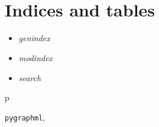 \documentclass[letterpaper,10pt,english]{sphinxmanual}
\begin{document}

\begin{fulllineitems}
\label{reference:Point.Point}~

\begin{fulllineitems}
\label{reference:Point.Point.vectorize}
\end{fulllineitems}


\end{fulllineitems}


\begin{fulllineitems}
\label{reference:GraphMLParser.GraphMLParser}~

\begin{fulllineitems}
\label{reference:GraphMLParser.GraphMLParser.parse}
\end{fulllineitems}


\begin{fulllineitems}
\label{reference:GraphMLParser.GraphMLParser.write}
\end{fulllineitems}


\end{fulllineitems}



\chapter{Indices and tables}
\label{index:indices-and-tables}\begin{itemize}
\item {} 
\emph{genindex}

\item {} 
\emph{modindex}

\item {} 
\emph{search}

\end{itemize}


\renewcommand{\indexname}{Python Module Index}
\begin{theindex}
\def\bigletter#1{{\Large\sffamily#1}\nopagebreak\vspace{1mm}}
\bigletter{p}
\item {\texttt{pygraphml}}, \pageref{reference:module-pygraphml}
\end{theindex}

\renewcommand{\indexname}{Index}
\printindex
\end{document}
